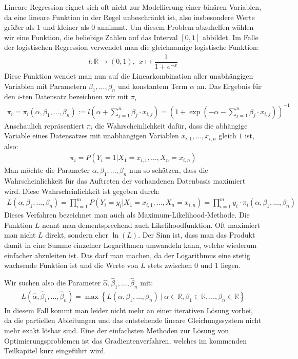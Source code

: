Lineare Regression eignet sich oft nicht zur Modellierung einer binären Variablen, da eine lineare Funktion in der Regel unbeschränkt ist, also insbesondere Werte größer als 1 und kleiner als 0 annimmt. Um diesem Problem abzuhelfen wählen wir eine Funktion, die beliebige Zahlen auf das Interval $[0, 1]$ abbildet. Im Falle der logistischen Regression verwendet man die gleichnamige logistische Funktion:
\begin{align*}
    l: \mathbb{R} \rightarrow (0, 1),~~ x \mapsto \dfrac{1}{1+e^{-x}}
\end{align*}
Diese Funktion wendet man nun auf die Linearkombination aller unabhängigen Variablen mit Parametern $\beta_1, \dots, \beta_n$ und konstantem Term $\alpha$ an. Das Ergebnis für den $i$-ten Datensatz bezeichnen wir mit $\pi_i$
\begin{align*}
    \pi_i = \pi_i(\alpha, \beta_1, \dots, \beta_n) := l \left( \alpha + \sum_{j=1}^n \beta_j \cdot x_{i, j} \right) = \left( 1 + \exp \left( - \alpha - \sum_{j=1}^n \beta_j \cdot x_{i, j} \right) \right)^{-1}
\end{align*}
Anschaulich repräsentiert $\pi_i$ die Wahrscheinlichkeit dafür, dass die abhängige Variable eines Datensatzes mit unabhängigen Variablen $x_{i, 1}, \dots, x_{i, n}$ gleich $1$ ist, also:
\begin{align*}
    \pi_i = P(Y_i = 1 | X_1 = x_{i, 1}, \dots, X_n = x_{i, n})
\end{align*}
Man möchte die Parameter $\alpha, \beta_1, \dots, \beta_n$ nun so schätzen, dass die Wahrscheinlichkeit für das Auftreten der vorhandenen Datenbasis maximiert wird. Diese Wahrscheinlichkeit ist gegeben durch:
\begin{align*}
    L(\alpha, \beta_1, \dots, \beta_n) = \prod_{i=1}^m P(Y_i = y_i | X_1 = x_{i, 1}, \dots, X_n = x_{i, n}) = \prod_{i=1}^m y_i \cdot \pi_i(\alpha, \beta_1, \dots, \beta_n)
\end{align*}
Dieses Verfahren bezeichnet man auch als Maximum-Likelihood-Methode. Die Funktion $L$ nennt man dementsprechend auch Likelihoodfunktion. Oft maximiert man nicht $L$ direkt, sondern eher $\ln(L)$. Der Sinn ist, dass man das Produkt damit in eine Summe einzelner Logarithmen umwandeln kann, welche wiederum einfacher abzuleiten ist. Das darf man machen, da der Logarithmus eine stetig wachsende Funktion ist und die Werte von $L$ stets zwischen $0$ und $1$ liegen.

Wir suchen also die Parameter $\hat\alpha, \hat\beta_1, \dots, \hat\beta_n$ mit:
\begin{align*}
    L(\hat\alpha, \hat\beta_1, \dots, \hat\beta_n) = \max \left\{ L(\alpha, \beta_1, \dots, \beta_n) ~|~ \alpha \in \mathbb{R}, \beta_1 \in \mathbb{R}, \dots, \beta_n \in \mathbb{R} \right\}
\end{align*}
In diesem Fall kommt man leider nicht mehr an einer iterativen Lösung vorbei, da die partiellen Ableitungen und das entstehende lineare Gleichungssystem nicht mehr exakt lösbar sind. Eine der einfachsten Methoden zur Lösung von Optimierungsproblemen ist das Gradientenverfahren, welches im kommenden Teilkapitel kurz eingeführt wird.

